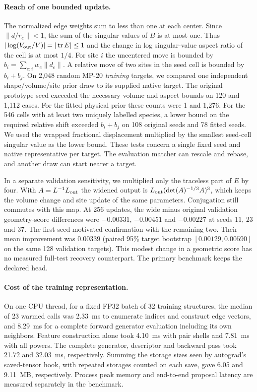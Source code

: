 \paragraph{Reach of one bounded update.}
The normalized edge weights sum to less than one at each center. Since
$\|d/r_c\|<1$, the sum of the singular values of $B$ is at most one.
Thus $|\log(V_{\rm out}/V)|=|\operatorname{tr}E|\le1$ and the change in log
singular-value aspect ratio of the cell is at most $1/4$. For site $i$ the uncentered
move is bounded by $b_i=\sum_{e:i}w_e\|d_e\|$. A relative move of two sites in the
seed cell is bounded by $b_i+b_j$. On 2,048 random MP-20 \emph{training} targets, we
compared one independent shape/volume/site prior draw to its supplied native target.
The original prototype seed exceeded the necessary volume and aspect bounds on 120
and 1,112 cases. For the fitted physical prior these counts were 1 and 1,276.
For the 546 cells with at least two uniquely labelled species, a lower bound on the
required relative shift exceeded $b_i+b_j$ on 108 original seeds and 78 fitted seeds.
We used the wrapped fractional displacement multiplied by the smallest seed-cell
singular value as the lower bound. These tests concern a single fixed seed and native
representative per target. The evaluation matcher can rescale and rebase, and another
draw can start nearer a target.

In a separate validation sensitivity, we multiplied only the traceless part of $E$
by four. With $A=L^{-1}L_{\rm out}$ the widened output is
$L_{\rm out}(\det(A)^{-1/3}A)^3$, which keeps the volume change and site update of the
same parameters. Conjugation still commutes with this map. At 256 updates, the wide
minus original validation geometry-score differences were $-0.00331$, $-0.00451$
and $-0.00227$ at seeds 11, 23 and 37. The first seed motivated confirmation with
the remaining two. Their mean improvement was $0.00339$ (paired 95\% target bootstrap
$[0.00129,0.00590]$ on the same 128 validation targets). This modest change in a geometric
score has no measured full-test recovery counterpart. The primary benchmark keeps the
declared head.

\paragraph{Cost of the training representation.}
On one CPU thread, for a fixed FP32 batch of 32 training structures, the median of
23 warmed calls was 2.33~ms to enumerate indices and construct edge vectors, and
8.29~ms for a complete forward generator evaluation including its own neighbors.
Feature construction alone took 4.10~ms with pair shells and 7.81~ms with all powers.
The complete generator, descriptor and backward pass took 21.72 and 32.03~ms, respectively.
Summing the storage sizes seen by autograd's saved-tensor hook, with repeated storages
counted on each save, gave 6.05 and 9.11~MB, respectively. Process peak memory and
end-to-end proposal latency are measured separately in the benchmark.
